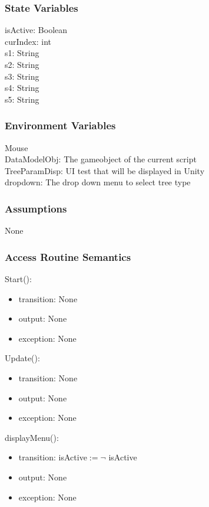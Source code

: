 \documentclass[12pt, titlepage]{article}
\begin{document}
\subsubsection{State Variables}
isActive: Boolean\\
curIndex: int\\
s1: String\\
s2: String\\
s3: String\\
s4: String\\
s5: String\\


\subsubsection{Environment Variables}
Mouse\\
DataModelObj: The gameobject of the current script\\
TreeParamDisp: UI test that will be displayed in Unity\\
dropdown: The drop down menu to select tree type
\subsubsection{Assumptions}
None
\subsubsection{Access Routine Semantics}

\noindent Start():
\begin{itemize}
\item transition: None 
\item output: None
\item exception: None
\end{itemize}

\noindent Update():
\begin{itemize}
\item transition: None 
\item output: None
\item exception: None
\end{itemize}

\noindent displayMenu():
\begin{itemize}
\item transition: isActive$\mathit{:= \neg }$ isActive
\item output: None
\item exception: None

\end{itemize}
\end{document}
